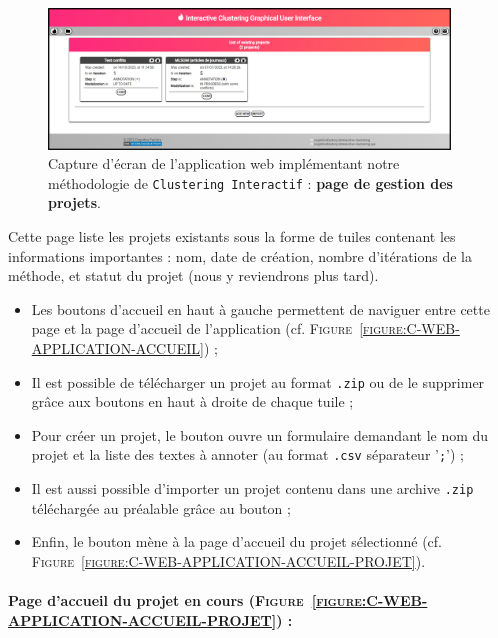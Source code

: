		\begin{figure}[H]
			\centering
			\includegraphics[width=0.95\textwidth]{figures/interactive-clustering-application-liste-projets}
			\caption{
				Capture d'écran de l'application web implémentant notre méthodologie de \texttt{Clustering Interactif} : \textbf{page de gestion des projets}.
			}
			\label{figure:C-WEB-APPLICATION-LISTE-PROJETS}
		\end{figure}
		
		Cette page liste les projets existants sous la forme de tuiles contenant les informations importantes : nom, date de création, nombre d'itérations de la méthode, et statut du projet (nous y reviendrons plus tard).
		
		\begin{itemize}
			\item Les boutons d'accueil en haut à gauche permettent de naviguer entre cette page et la page d'accueil de l'application (cf. \textsc{Figure~\ref{figure:C-WEB-APPLICATION-ACCUEIL}}) ;
			\item Il est possible de télécharger un projet au format \texttt{.zip} ou de le supprimer grâce aux boutons en haut à droite de chaque tuile ;
			\item Pour créer un projet, le bouton  ouvre un formulaire demandant le nom du projet et la liste des textes à annoter (au format \texttt{.csv} séparateur '\texttt{;}') ;
			\item Il est aussi possible d'importer un projet contenu dans une archive \texttt{.zip} téléchargée au préalable grâce au bouton  ;
			\item Enfin, le bouton  mène à la page d'accueil du projet sélectionné (cf. \textsc{Figure~\ref{figure:C-WEB-APPLICATION-ACCUEIL-PROJET}}).
		\end{itemize}
	
	
	\newpage
	\paragraph{Page d'accueil du projet en cours (\textsc{Figure~\ref{figure:C-WEB-APPLICATION-ACCUEIL-PROJET}}) :}
		
